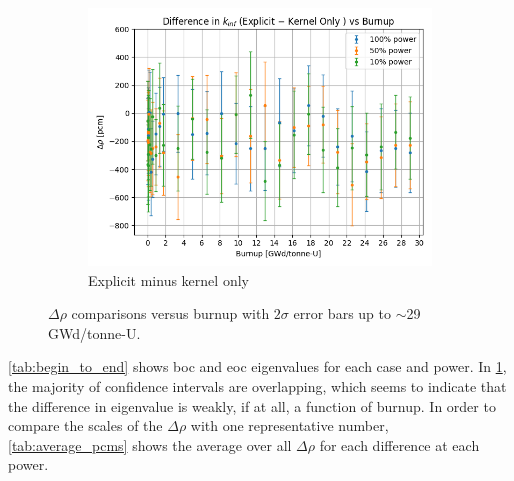 \documentclass[letterpaper]{physor2024}
\begin{document}
\begin{figure}[!h]
\begin{subfigure}{0.495\linewidth}
        \includegraphics[width=\linewidth]{figures/explicit_minus_kern.png}
        \caption{Explicit minus kernel only}
    \end{subfigure}
    \caption{$\Delta \rho$ comparisons versus burnup with $2\sigma$ error bars up to $\sim$29 GWd/tonne-U.}
    \label{fig:pcm_diffs}
\end{figure}

\cref{tab:begin_to_end} shows \gls{boc} and \gls{eoc} eigenvalues for each case and power. In \cref{fig:pcm_diffs}, the majority of confidence intervals are overlapping, which seems to indicate that the difference in eigenvalue is weakly, if at all, a function of burnup. In order to compare the scales of the $\Delta \rho$ with one representative number, \cref{tab:average_pcms} shows the average over all $\Delta \rho$ for each difference at each power.
\end{document}
